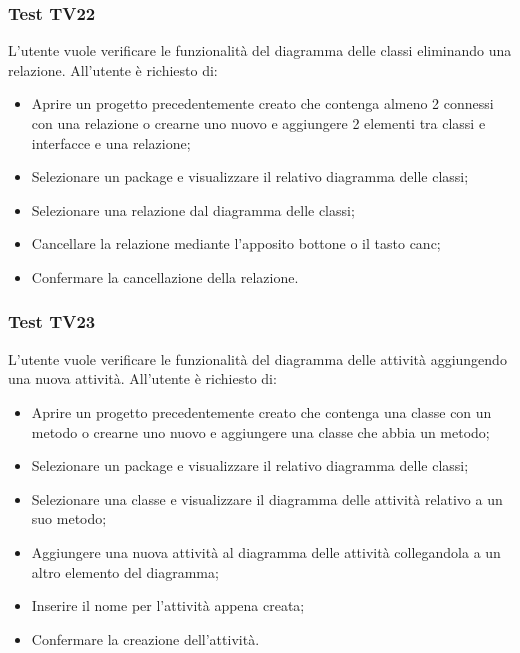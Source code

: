 \documentclass[../PianoDiQualifica.tex]{subfiles}
\begin{document}
	\subsubsection{Test TV22} 
	L'utente vuole verificare le funzionalità del diagramma delle classi eliminando una relazione. 
	All'utente è richiesto di: 
	\begin{itemize} 
		\item Aprire un progetto precedentemente creato che contenga almeno 2 connessi con una relazione o crearne uno nuovo e aggiungere 2 elementi tra classi e interfacce e una relazione; 
		\item Selezionare un package e visualizzare il relativo diagramma delle classi; 
		\item Selezionare una relazione dal diagramma delle classi; 
		\item Cancellare la relazione mediante l'apposito bottone o il tasto canc; 
		\item Confermare la cancellazione della relazione. %
	\end{itemize} 
	
	
	
	\subsubsection{Test TV23} 
	L'utente vuole verificare le funzionalità del diagramma delle attività aggiungendo una nuova attività. 
	All'utente è richiesto di: 
	\begin{itemize} 
		\item Aprire un progetto precedentemente creato che contenga una classe con un metodo o crearne uno nuovo e aggiungere una classe che abbia un metodo;
		\item Selezionare un package e visualizzare il relativo diagramma delle classi; 
		\item Selezionare una classe e visualizzare il diagramma delle attività relativo a un suo metodo; %
		\item Aggiungere una nuova attività al diagramma delle attività collegandola a un altro elemento del diagramma; 
		\item Inserire il nome per l'attività appena creata; %
		\item Confermare la creazione dell'attività. 
	\end{itemize} 
	
\end{document}
